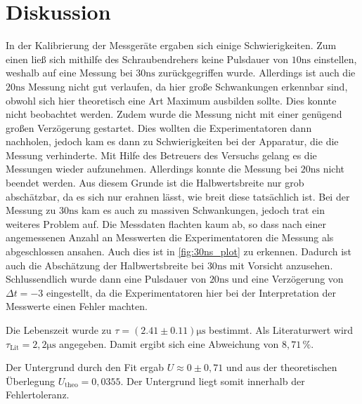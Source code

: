 \section{Diskussion}
\label{sec:Diskussion}

In der Kalibrierung der Messgeräte ergaben sich einige Schwierigkeiten.
Zum einen ließ sich mithilfe des Schraubendrehers keine Pulsdauer von $10 \unit{\nano\second}$ einstellen, weshalb auf eine Messung bei $30 \unit{\nano\second}$ zurückgegriffen wurde.
Allerdings ist auch die $20 \unit{\nano\second}$ Messung nicht gut verlaufen, da hier große Schwankungen erkennbar sind, obwohl sich hier theoretisch eine Art Maximum ausbilden sollte.
Dies konnte nicht beobachtet werden.
Zudem wurde die Messung nicht mit einer genügend großen Verzögerung gestartet.
Dies wollten die Experimentatoren dann nachholen, jedoch kam es dann zu Schwierigkeiten bei der Apparatur, die die Messung verhinderte.
Mit Hilfe des Betreuers des Versuchs gelang es die Messungen wieder aufzunehmen.
Allerdings konnte die Messung bei $20 \unit{\nano\second}$ nicht beendet werden.
Aus diesem Grunde ist die Halbwertsbreite nur grob abschätzbar, da es sich nur erahnen lässt, wie breit diese tatsächlich ist.
Bei der Messung zu $30 \unit{\nano\second}$ kam es auch zu massiven Schwankungen, jedoch trat ein weiteres Problem auf.
Die Messdaten flachten kaum ab, so dass nach einer angemessenen Anzahl an Messwerten die Experimentatoren die Messung als abgeschlossen ansahen.
Auch dies ist in \autoref{fig:30ns_plot} zu erkennen.
Dadurch ist auch die Abschätzung der Halbwertsbreite bei $30 \unit{\nano\second}$ mit Vorsicht anzusehen.
Schlussendlich wurde dann eine Pulsdauer von $20 \unit{\nano\second}$ und eine Verzögerung von $\Delta t = -3$ eingestellt, da die Experimentatoren hier bei der Interpretation der Messwerte einen Fehler machten.

Die Lebenszeit wurde zu $\tau = (2.41 \pm 0.11) \unit{\micro\second}$ bestimmt.
Als Literaturwert wird $\tau_\text{Lit} = 2,2 \unit{\micro\second}$ angegeben.
Damit ergibt sich eine Abweichung von $8,71 \, \% $.

Der Untergrund durch den Fit ergab $U \approx 0 \pm 0,71$ und aus der theoretischen Überlegung $U_\text{theo} = 0, 0355$.
Der Untergrund liegt somit innerhalb der Fehlertoleranz.